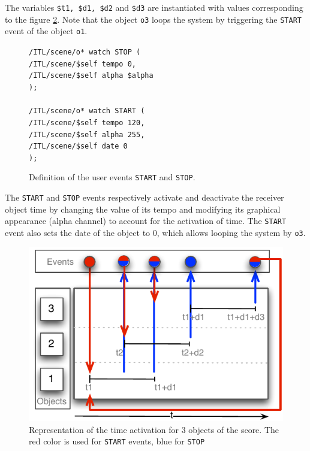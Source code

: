 \documentclass{article}
\newcommand{\OSC}[1]	{{\fontsize{8.5pt}{8pt} \selectfont\texttt{#1}}}
\newcommand{\tab}{\hspace*{4mm}}
\newcommand{\sample}[1]		{\vspace{-0.2em}\begin{center}\colorbox{mygrey}{\begin{minipage}[t]{0.98\columnwidth} {\small \texttt{#1}}\end{minipage}}\end{center}}
\begin{document}
The variables \OSC{\$t1, \$d1, \$d2} and \OSC{\$d3} are instantiated with values corresponding to the figure \ref{fig:sample}. Note that the object \OSC{o3} loops the system by triggering the \OSC{START} event of the object \OSC{o1}.

\begin{figure}[h]
   \centering
\sample{/ITL/scene/o* watch STOP ( \\
   \tab/ITL/scene/\$self tempo 0,\\
   \tab/ITL/scene/\$self alpha \$alpha	\\
);\\
\\
/ITL/scene/o* watch START ( \\
   \tab/ITL/scene/\$self tempo 120,\\
   \tab/ITL/scene/\$self alpha 255,\\
   \tab/ITL/scene/\$self date 0\\
);
}
   \caption{Definition of the user events \OSC{START} and \OSC{STOP}.}
   \label{fig:ex2}
\end{figure}

The \OSC{START} and \OSC{STOP} events respectively activate and deactivate the receiver object time by changing the value of its tempo and modifying its graphical appearance (alpha channel) to account for the activation of time. The \OSC{START} event also sets the date of the object to 0, which allows looping the system by \OSC{o3}.
\begin{figure}[h]
   \centering
   \includegraphics[width=0.8\columnwidth]{imgs/sample}
   \caption{Representation of the time activation for 3 objects of the score. The red color is used for \OSC{START} events, blue for \OSC{STOP}}
   \label{fig:sample}
\end{figure}


\end{document}
